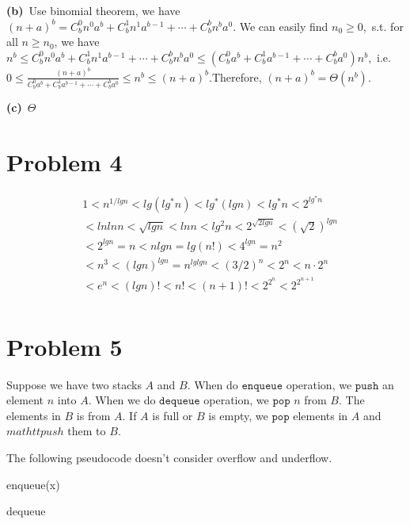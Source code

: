 \documentclass[]{article}
\begin{document}
	\textbf{(b)}\ Use binomial theorem, we have $(n+a)^b = C_b^0n^0a^b + C_b^1n^1a^{b-1} + \cdots + C_b^bn^ba^0$. We can easily find $n_0\geq 0$,\ s.t. for all $n\geq n_0$, we have $ n^b\leq C_b^0n^0a^b + C_b^1n^1a^{b-1} + \cdots + C_b^bn^ba^0\leq (C_b^0a^b + C_b^1a^{b-1} + \cdots + C_b^ba^0)n^b$,\ i.e.$0\leq\frac{(n+a)^b}{C_b^0a^b + C_b^1a^{b-1} + \cdots + C_b^ba^0}\leq n^b\leq (n+a)^b$.Therefore, $(n+a)^b=\Theta(n^b)$.
	
	\textbf{(c)}\ $\Theta$
	\section{Problem 4}
	\begin{equation*}
	\begin{aligned}
	&1 < n^{1/lgn} < lg(lg^*n) < lg^*(lgn) < lg^*n < 2^{lg^*n}\\ 
	&< lnlnn < \sqrt{lgn} < lnn < lg^2n < 2^{\sqrt{2lgn}} < (\sqrt{2})^{lgn}\\ 
	&< 2^{lgn} = n < nlgn = lg(n!) < 4^{lgn} = n^2\\
	&< n^3 < (lgn)^{lgn} = n^{lglgn} <(3/2)^n < 2^n < n\cdot 2^n\\ 
	&< e^n < (lgn)! < n! < (n+1)! < 2^{2^n} < 2^{2^{n+1}}\\
	\end{aligned}
	\end{equation*}
	
	\section{Problem 5}
	Suppose we have two stacks $A$ and $B$. When do $\mathtt{enqueue}$ operation, we $\mathtt{push}$ an element $n$ into $A$. When we do $\mathtt{dequeue}$ operation, we $\mathtt{pop}$ $n$ from $B$. The elements in $B$ is from $A$. If $A$ is full or $B$ is empty, we $\mathtt{pop}$ elements in $A$ and $mathtt{push}$ them to $B$.
	
	The following pseudocode doesn't consider overflow and underflow. 
	\begin{algorithm}[h]
		\caption{enqueue(x)} %
		\begin{algorithmic}[1]
		\Repeat
		\EndIf
		\end{algorithmic}
	\end{algorithm}

	\begin{algorithm}[h]
		\caption{dequeue} %
		\begin{algorithmic}[1]
			\Repeat
			\EndIf
		\end{algorithmic}
	\end{algorithm}
\end{document}
